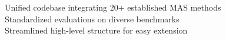 \documentclass[preview]{standalone}
\begin{document}
Unified codebase integrating 20+ established MAS methods\\Standardized evaluations on diverse benchmarks\\Streamlined high-level structure for easy extension\\
\end{document}

